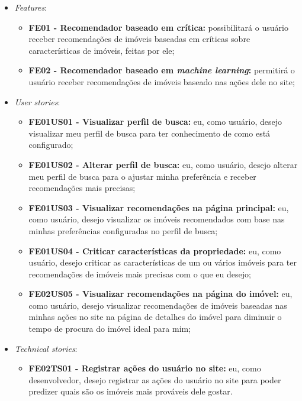 \begin{itemize}
    \item \textit{Features}:
    \begin{itemize}
        \item \textbf{FE01 - Recomendador baseado em crítica:} possibilitará o usuário receber recomendações de imóveis baseadas em críticas sobre características de imóveis, feitas por ele;

        \item \textbf{FE02 - Recomendador baseado em \textit{machine learning}:} permitirá o usuário receber recomendações de imóveis baseado nas ações dele no site;
    \end{itemize}
    
    \item \textit{User stories}:
    \begin{itemize}
        \item \textbf{FE01US01 - Visualizar perfil de busca:} eu, como usuário, desejo visualizar meu perfil de busca para ter conhecimento de como está configurado;
        
        \item \textbf{FE01US02 - Alterar perfil de busca:} eu, como usuário, desejo alterar meu perfil de busca para o ajustar minha preferência e receber recomendações mais precisas;
        
        \item \textbf{FE01US03 - Visualizar recomendações na página principal:} eu, como usuário, desejo visualizar os imóveis recomendados com base nas minhas preferências configuradas no perfil de busca;
        
        \item \textbf{FE01US04 - Criticar características da propriedade:} eu, como usuário, desejo criticar as características de um ou vários imóveis para ter recomendações de imóveis mais precisas com o que eu desejo;
        
        \item \textbf{FE02US05 - Visualizar recomendações na página do imóvel:} eu, como usuário, desejo visualizar recomendações de imóveis baseadas nas minhas ações no site na página de detalhes do imóvel para diminuir o tempo de procura do imóvel ideal para mim;
    \end{itemize}
    
    \item \textit{Technical stories}:
    \begin{itemize}
        \item \textbf{FE02TS01 - Registrar ações do usuário no site:} eu, como desenvolvedor, desejo registrar as ações do usuário no site para poder predizer quais são os imóveis mais prováveis dele gostar.
    \end{itemize}
\end{itemize}


